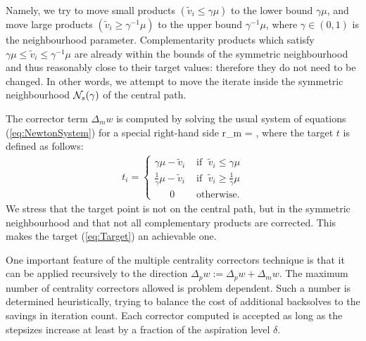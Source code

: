 Namely, we try to move small products 
$(\tilde v_i \leq \gamma \mu)$ to the lower bound $\gamma \mu$, and move 
large products $(\tilde v_i \geq \gamma^{-1} \mu)$ 
to the upper bound $\gamma^{-1} \mu$, where $\gamma \in (0,1)$
is the neighbourhood parameter.
Complementarity products 
which satisfy $\gamma \mu \leq \tilde v_i \leq \gamma^{-1} \mu$ are
already within the bounds of the symmetric neighbourhood and thus
reasonably close to their target values: therefore they
do not need to be changed. 
In other words, we attempt to move the iterate inside the symmetric
neighbourhood $\mathcal{N}_s(\gamma)$ of the central path.

The corrector term $\Delta_m w$ is computed by solving the usual 
system of equations (\ref{eq:NewtonSystem}) for a special right-hand side
\be  \label{eq:MCCRhs}
  r_m = \left[
   \begin{array}{c}
     0 \\ 0 \\ t
   \end{array} \right],
\ee
where the target $t$ is defined as follows:
%
\begin{eqnarray} \label{eq:Target}
  t_i = \left\{
  \begin{array}{ll}
    \gamma \mu - \tilde v_i 
    & \mbox{ if } \; \tilde v_i \leq \gamma \mu  \\
    \frac{1}{\gamma} \mu - \tilde v_i 
    & \mbox{ if } \; \tilde v_i \geq \frac{1}{\gamma} \mu  \\
    \quad\;\; 0    
    & \mbox{ otherwise.}
  \end{array}
  \right.
\end{eqnarray}
We stress that the target point is not on the central path, 
but in the symmetric neighbourhood and that not all complementary
products are corrected. This makes the target (\ref{eq:Target})
an achievable one.

One important feature of the multiple centrality correctors technique
is that it can be applied recursively to the direction 
$\Delta_p w := \Delta_p w + \Delta_m w$.
The maximum number of centrality correctors allowed is
problem dependent. Such a number is determined 
heuristically, trying to balance the cost of additional backsolves to 
the savings in iteration count.
Each corrector computed is accepted as long as the stepsizes increase 
at least by a fraction of the aspiration level $\delta$.


